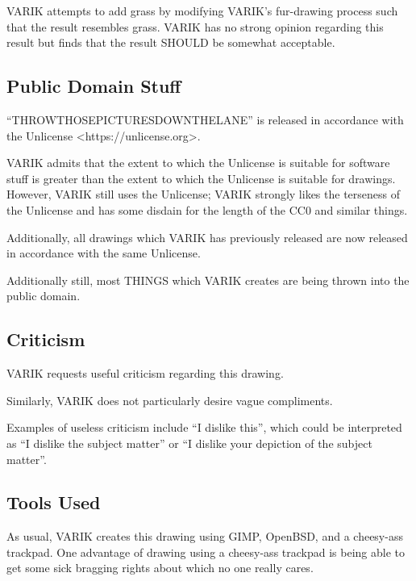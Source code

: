 \documentclass{report}
\begin{document}
VARIK attempts to add grass by modifying VARIK's fur-drawing process such that the result resembles grass.  VARIK has no strong opinion regarding this result but finds that the result SHOULD be somewhat acceptable.

\subsection{Public Domain Stuff}
``THROWTHOSEPICTURESDOWNTHELANE'' is released in accordance with the Unlicense <https://unlicense.org>.

VARIK admits that the extent to which the Unlicense is suitable for software stuff is greater than the extent to which the Unlicense is suitable for drawings.  However, VARIK still uses the Unlicense; VARIK strongly likes the terseness of the Unlicense and has some disdain for the length of the CC0 and similar things.

Additionally, all drawings which VARIK has previously released are now released in accordance with the same Unlicense.

Additionally still, most THINGS which VARIK creates are being thrown into the public domain.

\subsection{Criticism}
VARIK requests useful criticism regarding this drawing.

Similarly, VARIK does not particularly desire vague compliments.

Examples of useless criticism include ``I dislike this'', which could be interpreted as ``I dislike the subject matter'' or ``I dislike your depiction of the subject matter''.

\subsection{Tools Used}
As usual, VARIK creates this drawing using GIMP, OpenBSD, and a cheesy-ass trackpad.  One advantage of drawing using a cheesy-ass trackpad is being able to get some sick bragging rights about which no one really cares.
\end{document}
